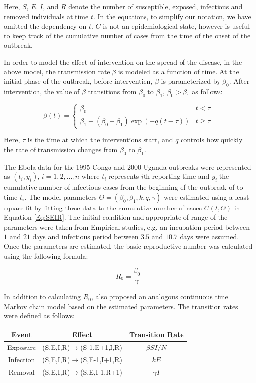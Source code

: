 \documentclass[10pt, journal,onecolumn]{IEEEtran}
\begin{document}
Here, $S$, $E$, $I$, and $R$ denote the number of susceptible, exposed, infectious and removed
individuals at time $t$. In the equations, to simplify our notation, we have omitted the dependency
on $t$. $C$ is not an epidemiological state, however is useful to keep track of the cumulative
number of cases from the time of the onset of the outbreak.

In order to model the effect of intervention on the spread of the disease, in the above model, the
transmission rate $\beta$ is modeled as a function of time. At the initial phase of the outbreak,
before intervention, $\beta$ is parameterized by $\beta_0$. After intervention, the value of
$\beta$ transitions from $\beta_0$ to $\beta_1$, $\beta_0>\beta_1$ as follows:

\[
\beta(t)=\begin{cases}
\beta_{0} & t<\tau\\
\beta_{1}+(\beta_{0}-\beta_{1})\exp\left(-q\left(t-\tau\right)\right) & t\ge\tau
\end{cases}
\]

Here, $\tau$ is the time at which the interventions start, and $q$ controls how quickly the rate
of transmission changes from $\beta_0$ to $\beta_1$.

The Ebola data for the 1995 Congo and 2000 Uganda outbreaks were represented as $(t_i,y_i)$,
$i=1,2,\ldots,n$ where $t_i$ represents $i$th reporting time and $y_i$ the cumulative number of
infectious cases from the beginning of the outbreak of to time $t_i$.  The model parameters
$\Theta=(\beta_0,\beta_1,k,q,\gamma)$ were estimated using a least-square fit by fitting these data to
the cumulative number of cases $C(t,\Theta)$ in Equation \ref{Eq:SEIR}. The initial condition and
appropriate of range of the parameters were taken from Empirical studies, e.g. an incubation period
between $1$ and $21$ days and infectious period between $3.5$ and $10.7$ days were assumed. Once the
parameters are estimated, the basic reproductive number was calculated using the following formula:

\begin{equation}
R_0 = \dfrac{\beta_0}{\gamma}
\end{equation}


In addition to calculating $R_0$, \citep{chowell2004basic} also proposed an analogous continuous time Markov chain model based on the estimated parameters. The transition rates were defined as follows:

\begin{center}
\begin{tabular}{|c|c|c|}
\hline
Event & Effect & Transition Rate\tabularnewline
\hline
\hline
Exposure & (S,E,I,R)$\to$(S-1,E+1,I,R) & $\beta SI/N$\tabularnewline
\hline
Infection & (S,E,I,R)$\to$(S,E-1,I+1,R) & $kE$\tabularnewline
\hline
Removal & (S,E,I,R)$\to$(S,E,I-1,R+1) & $\gamma I$\tabularnewline
\hline
\end{tabular}
\end{center}
\end{document}
